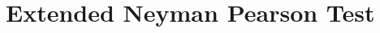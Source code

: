 \section{Extended Neyman Pearson Test}

\newcommand{\bom}{\boldsymbol{\omega}}

\typeout{}


\typeout{}


\typeout{}


\typeout{}


\typeout{}

                     
